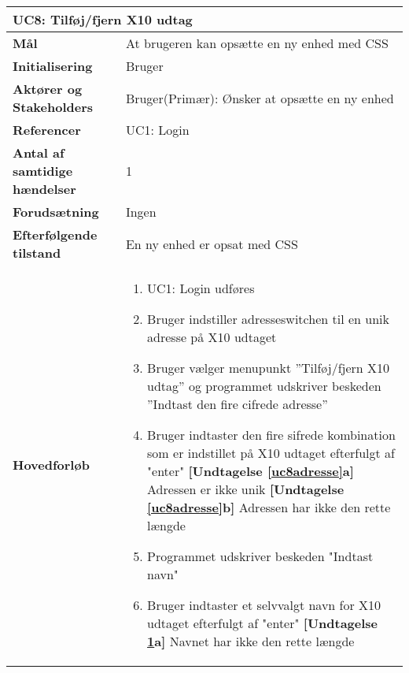\begin{table}[H] \centering
\begin{tabular}{|p{6cm}|p{8cm}|}
	\hline
		\multicolumn{2}{|l|}{\textbf{UC8: Tilføj/fjern X10 udtag}} \\\hline
		
		\textbf{Mål}							&At brugeren kan opsætte en ny enhed med CSS						\\\hline
		\textbf{Initialisering}				&Bruger					 										\\\hline
		\textbf{Aktører og Stakeholders}		&Bruger(Primær): Ønsker at opsætte en ny enhed					\\\hline
		\textbf{Referencer}					&UC1: Login														\\\hline
		\textbf{Antal af samtidige hændelser}&1 																\\\hline
		\textbf{Forudsætning}				&Ingen															\\\hline
		\textbf{Efterfølgende tilstand}		&En ny enhed er opsat med CSS									\\\hline
		\textbf{Hovedforløb}					
			&\begin{enumerate}

				\item UC1: Login udføres
				
				\item \label{uc8indstilAdresse} Bruger indstiller adresseswitchen til en unik adresse på X10 udtaget
				
				\item Bruger vælger menupunkt ''Tilføj/fjern X10 udtag'' og programmet udskriver beskeden ''Indtast den fire cifrede adresse''
				
				\item \label{uc8adresse} Bruger indtaster den fire sifrede kombination som er indstillet på X10 udtaget efterfulgt af "enter"\newline
						\textbf{[Undtagelse \ref{uc8adresse}a]} Adressen er ikke unik\newline
						\textbf{[Undtagelse \ref{uc8adresse}b]} Adressen har ikke den rette længde
				
				\item \label{uc8indstilNavn} Programmet udskriver beskeden "Indtast navn"
				
				\item \label{uc8navn} Bruger indtaster et selvvalgt navn for X10 udtaget efterfulgt af "enter"\newline
						\textbf{[Undtagelse \ref{uc8navn}a]} Navnet har ikke den rette længde
				

\end{enumerate}
\end{tabular}
\end{table}
